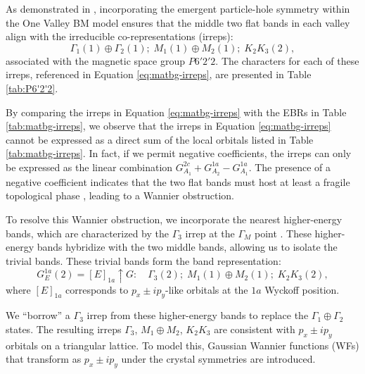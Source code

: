 As demonstrated in \cite{all_magic_angles}, incorporating the emergent particle-hole symmetry within the One Valley BM model ensures that the middle two flat bands in each valley align with the irreducible co-representations (irreps):
\begin{equation} \label{eq:matbg-irreps}
\Gamma_1(1) \oplus \Gamma_2(1); \; M_1(1) \oplus M_2(1); \; K_2 K_3(2),
\end{equation}
associated with the magnetic space group \( P6'2'2 \). The characters for each of these irreps, referenced in Equation \ref{eq:matbg-irreps}, are presented in Table \ref{tab:P6'2'2}.


By comparing the irreps in Equation \ref{eq:matbg-irreps} with the EBRs in Table \ref{tab:matbg-irreps}, we observe that the irreps in Equation \ref{eq:matbg-irreps} cannot be expressed as a direct sum of the local orbitals listed in Table \ref{tab:matbg-irreps}. In fact, if we permit negative coefficients, the irreps can only be expressed as the linear combination \( G_{A_1}^{2c} + G_{A_2}^{1a} - G_{A_1}^{1a} \). The presence of a negative coefficient indicates that the two flat bands must host at least a fragile topological phase \cite{FragileTopology_Po2018}, leading to a Wannier obstruction.

To resolve this Wannier obstruction, we incorporate the nearest higher-energy bands, which are characterized by the \(\Gamma_3\) irrep at the \(\Gamma_M\) point \cite{topoheavyfermion2022}. These higher-energy bands hybridize with the two middle bands, allowing us to isolate the trivial bands. These trivial bands form the band representation:
\begin{equation} \label{eq:trivial-irreps}
G_E^{1a}(2) = [E]_{1a} \uparrow G: \quad \Gamma_3(2); \; M_1(1) \oplus M_2(1); \; K_2 K_3(2),
\end{equation}
where \([E]_{1a}\) corresponds to \(p_x \pm i p_y\)-like orbitals at the \(1a\) Wyckoff position.

We ``borrow'' a $\Gamma_3$ irrep from these higher-energy bands to replace the $\Gamma_1 \oplus \Gamma_2$ states. The resulting irreps $\Gamma_3$, $M_1 \oplus M_2$, $K_2 K_3$ are consistent with $p_x \pm i p_y$ orbitals on a triangular lattice. To model this, Gaussian Wannier functions (WFs) that transform as $p_x \pm i p_y$ under the crystal symmetries are introduced.

